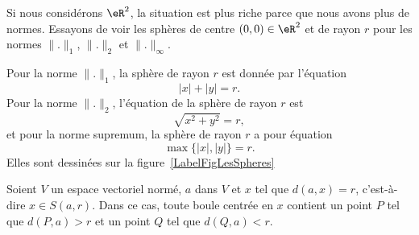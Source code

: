 \begin{example}
	Si nous considérons \( \eR^2\), la situation est plus riche parce que nous avons plus de normes. Essayons de voir les sphères de centre \( (0,0)\in\eR^2\) et de rayon \( r\) pour les normes \( \| . \|_1\), \( \| . \|_2\) et \( \| . \|_{\infty}\).

	Pour la norme \( \| . \|_1\), la sphère de rayon \( r\) est donnée par l'équation
	\begin{equation}
		| x |+| y |=r.
	\end{equation}
	Pour la norme \( \| . \|_2\), l'équation de la sphère de rayon \( r\) est
	\begin{equation}
		\sqrt{x^2+y^2}=r,
	\end{equation}
	et pour la norme supremum, la sphère de rayon \( r\) a pour équation
	\begin{equation}
		\max\{ | x |,| y | \}=r.
	\end{equation}
	Elles sont dessinées sur la figure~\ref{LabelFigLesSpheres}
	\newcommand{\CaptionFigLesSpheres}{Les sphères de rayon \( 1\) pour les trois normes classiques.}
	
\end{example}

\begin{proposition}		\label{PropBoitPtLoin}
	Soient \( V\) un espace vectoriel normé, \( a\) dans \( V\) et \( x\) tel que \( d(a,x)=r\), c'est-à-dire \( x\in S(a,r)\). Dans ce cas, toute boule centrée en \( x\) contient un point \( P\) tel que \( d(P,a)>r\) et un point \( Q\) tel que \( d(Q,a)<r\).
\end{proposition}


